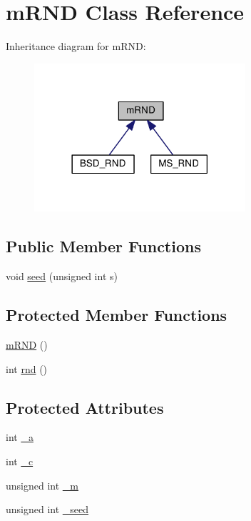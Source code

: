\hypertarget{classmRND}{}\section{m\+R\+ND Class Reference}
\label{classmRND}


Inheritance diagram for m\+R\+ND\+:
\nopagebreak
\begin{figure}[H]
\begin{center}
\leavevmode
\includegraphics[width=222pt]{classmRND__inherit__graph}
\end{center}
\end{figure}
\subsection*{Public Member Functions}
\begin{DoxyCompactItemize}
\item 
void \hyperlink{classmRND_ad6c73a1c7292e22dfba539d658beab9e}{seed} (unsigned int s)
\end{DoxyCompactItemize}
\subsection*{Protected Member Functions}
\begin{DoxyCompactItemize}
\item 
\hyperlink{classmRND_ad1fb0b9caed5cb4378ae41f31f712f88}{m\+R\+ND} ()
\item 
int \hyperlink{classmRND_af757c98d18750ecf464a2748f4958ea1}{rnd} ()
\end{DoxyCompactItemize}
\subsection*{Protected Attributes}
\begin{DoxyCompactItemize}
\item 
int \hyperlink{classmRND_a96a1801422b5e22ac46da273b9ac68cf}{\+\_\+a}
\item 
int \hyperlink{classmRND_acfb6e24a4a40bd036057d667efb5f15c}{\+\_\+c}
\item 
unsigned int \hyperlink{classmRND_a77107d3df520656372e80e8934bc93bc}{\+\_\+m}
\item 
unsigned int \hyperlink{classmRND_a7c8375524993fb98192122643deac7d7}{\+\_\+seed}
\end{DoxyCompactItemize}


